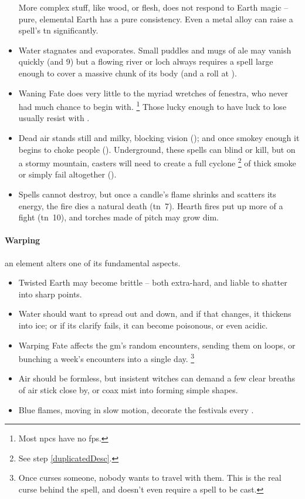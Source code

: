 \begin{multicols}{2}
\begin{itemize}
  More complex stuff, like wood, or flesh, does not respond to Earth magic -- pure, elemental Earth has a pure consistency.
  Even a metal alloy can raise a spell's \gls{tn} significantly.
  \item
  Water stagnates and evaporates.
  Small puddles and mugs of ale may vanish quickly (\tn[6] and 9)
  but a flowing river or loch always requires a spell large enough to cover a massive chunk of its body (and a roll at \tn[12]).
  \item
  Waning Fate does very little to the myriad wretches of \gls{fenestra}, who never had much chance to begin with.%
  \footnote{Most \glspl{npc} have no \glspl{fp}.}
  Those lucky enough to have luck to lose usually resist with .
  \item
  Dead air stands still and milky, blocking vision (\tn[7]);
  and once smokey enough it begins to choke people (\tn[9]).
  Underground, these spells can blind or kill, but on a stormy mountain, casters will need to create a full cyclone%
  \footnote{See step \vref{duplicatedDesc}.}
  of thick smoke or simply fail altogether (\tn[16]).
  \item
  Spells cannot destroy, but once a candle's flame shrinks and scatters its energy, the fire dies a natural death (\gls{tn}~7).
  Hearth fires put up more of a fight (\gls{tn}~10), and torches made of pitch may grow dim.
\end{itemize}

\paragraph{Warping}
an element alters one of its fundamental aspects.

\begin{itemize}
  \item
  Twisted Earth may become brittle -- both extra-hard, and liable to shatter into sharp points.
  \item
  Water should want to spread out and down, and if that changes, it thickens into ice;
  or if its clarify fails, it can become poisonous, or even acidic.
  \item
  Warping Fate affects the \gls{gm}'s random encounters, sending them on loops, or bunching a week's encounters into a single day.%
  \footnote{Once  curses someone, nobody wants to travel with them.  This is the real curse behind the spell, and doesn't even require a spell to be cast.}
  \item
  Air should be formless, but insistent witches can demand a few clear breaths of air stick close by, or coax mist into forming simple shapes.
  \item
  Blue flames, moving in slow motion, decorate the festivals every .
\end{itemize}


\end{multicols}
